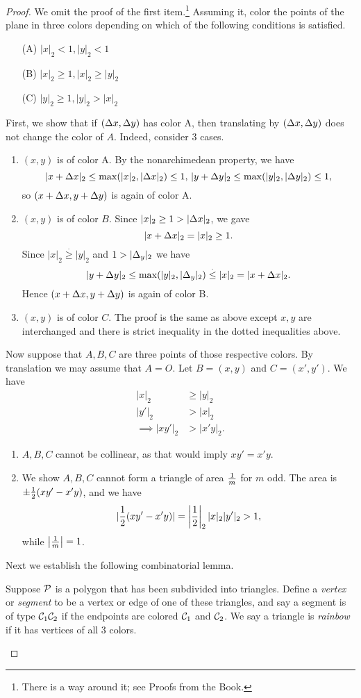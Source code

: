 \begin{proof}
We omit the proof of the first item.\footnote{There is a way around it; see Proofs from the Book.}  Assuming it, 
color the points of the plane in three colors depending on which of the following conditions is satisfied.
\begin{enumerate}
\item[(A)] $|x|_2<1,|y|_2<1$
\item[(B)] $|x|_2\ge 1,|x|_2\ge |y|_2$
\item[(C)] $|y|_2\ge 1,|y|_2> |x|_2$
\end{enumerate}
First, we show that if $(\De x,\De y)$ has color A, then translating by $(\De x,\De y)$ does not change the color of $A$. Indeed, consider 3 cases.
\begin{enumerate}
\item
$(x,y)$ is of color A. By the nonarchimedean property, we have
\[
|x+\De x|_2\le \max(|x|_2,|\De x|_2)\le 1, \,
|y+\De y|_2\le \max(|y|_2,|\De y|_2)\le 1,
\]
so $(x+\De x,y+\De y)$ is again of color A.
\item
$(x,y)$ is of color $B$. Since $|x|_2\ge 1>|\De x|_2$, we gave
\[
|x+\De x|_2=|x|_2\ge 1.
\]
Since $|x|_2\stackrel{.}{\ge} |y|_2$ and $1>|\De_y|_2$ we have
\[
|y+\De y|_2\le \max(|y|_2,|\De_y|_2)\stackrel{.}{\le} |x|_2=|x+\De x|_2.
\]
Hence $(x+\De x,y+\De y)$ is again of color B.
\item
$(x,y)$ is of color $C$. The proof is the same as above except $x,y$ are interchanged and there is strict inequality in the dotted inequalities above.
\end{enumerate}
Now suppose that $A,B,C$ are three points of those respective colors. By translation we may assume that $A=O$. Let $B=(x,y)$ and $C=(x',y')$. We have
\begin{align*}
|x|_2&\ge |y|_2\\
|y'|_2&> |x|_2\\
\implies |xy'|_2&>|x'y|_2.
\end{align*}
\begin{enumerate}
\item
$A,B,C$ cannot be collinear, as that would imply $xy'=x'y$.
\item
We show $A,B,C$ cannot form a triangle of area $\rc m$ for $m$ odd. The area is $\pm \rc 2(xy'-x'y)$, and we have
\[
|\rc 2 (xy'-x'y)|=\ab{\rc 2}_2|x|_2|y'|_2>1,
\]
while $\ab{\rc m}=1$.
\end{enumerate}
Next we establish the following combinatorial lemma.
\begin{lem}
Suppose $\cal P$ is a polygon that has been subdivided into triangles.
Define a {\it vertex} or {\it segment} to be a vertex or edge of one of these triangles, and say a segment is of type $\cal C_1\cal C_2$ if the endpoints are colored $\cal C_1$ and $\cal C_2$. We say a triangle is {\it rainbow} if it has vertices of all 3 colors.


\end{lem}
\end{proof}
